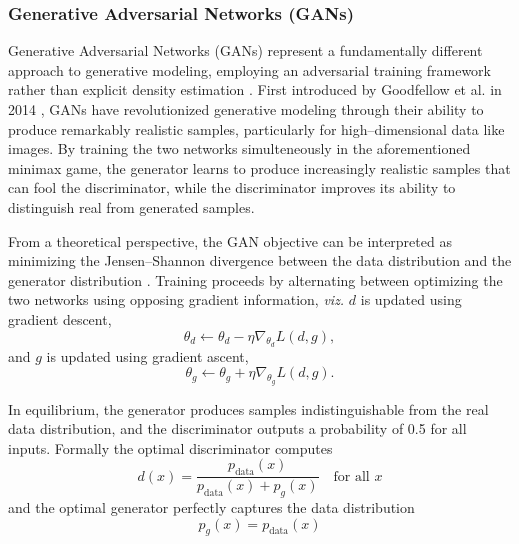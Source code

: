     \subsubsection{Generative Adversarial Networks (GANs)}
    \label{subsubsec:GANs}
        Generative Adversarial Networks (GANs) represent a fundamentally different approach to generative modeling, employing an adversarial training framework rather than explicit density estimation .
        First introduced by Goodfellow et al. in 2014 , GANs have revolutionized generative modeling through their ability to produce remarkably realistic samples, particularly for high--dimensional data like images.
        By training the two networks simulteneously in the aforementioned minimax game, the generator learns to produce increasingly realistic samples that can fool the discriminator, while the discriminator improves its ability to distinguish real from generated samples.
    
        From a theoretical perspective, the GAN objective can be interpreted as minimizing the Jensen--Shannon divergence between the data distribution and the generator distribution .
        Training proceeds by alternating between optimizing the two networks using opposing gradient information, \textit{viz.} \(d\) is updated using gradient descent,
        \begin{equation}
            \theta_d \leftarrow \theta_d - \eta \nabla_{\theta_d} L(d, g),
        \end{equation}
        and \(g\) is updated using gradient ascent,
        \begin{equation}
            \theta_g \leftarrow \theta_g + \eta \nabla_{\theta_g} L(d, g).
        \end{equation}
        
        In equilibrium, the generator produces samples indistinguishable from the real data distribution, and the discriminator outputs a probability of 0.5 for all inputs.
        Formally the optimal discriminator computes
        \begin{equation}
            d(x) = \frac{p_{\text{data}}(x)}{p_{\text{data}}(x) + p_g(x)}\quad\text{for all } x
        \end{equation}
        and the optimal generator perfectly captures the data distribution
        \begin{equation}
            p_g(x) = p_{\text{data}}(x)
        \end{equation}
        
